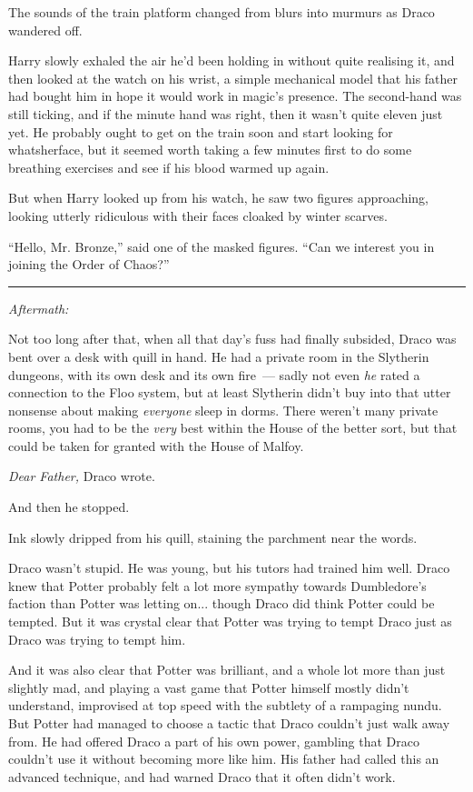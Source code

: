 The sounds of the train platform changed from blurs into murmurs as Draco wandered off.

Harry slowly exhaled the air he'd been holding in without quite realising it, and then looked at the watch on his wrist, a simple mechanical model that his father had bought him in hope it would work in magic's presence. The second-hand was still ticking, and if the minute hand was right, then it wasn't quite eleven just yet. He probably ought to get on the train soon and start looking for whatsherface, but it seemed worth taking a few minutes first to do some breathing exercises and see if his blood warmed up again.

But when Harry looked up from his watch, he saw two figures approaching, looking utterly ridiculous with their faces cloaked by winter scarves.

``Hello, Mr. Bronze,'' said one of the masked figures. ``Can we interest you in joining the Order of Chaos?''

\begin{center}\rule{3in}{0.4pt}\end{center}

\emph{Aftermath:}

Not too long after that, when all that day's fuss had finally subsided, Draco was bent over a desk with quill in hand. He had a private room in the Slytherin dungeons, with its own desk and its own fire~--- sadly not even \emph{he} rated a connection to the Floo system, but at least Slytherin didn't buy into that utter nonsense about making \emph{everyone} sleep in dorms. There weren't many private rooms, you had to be the \emph{very} best within the House of the better sort, but that could be taken for granted with the House of Malfoy.

\emph{Dear Father,} Draco wrote.

And then he stopped.

Ink slowly dripped from his quill, staining the parchment near the words.

Draco wasn't stupid. He was young, but his tutors had trained him well. Draco knew that Potter probably felt a lot more sympathy towards Dumbledore's faction than Potter was letting on... though Draco did think Potter could be tempted. But it was crystal clear that Potter was trying to tempt Draco just as Draco was trying to tempt him.

And it was also clear that Potter was brilliant, and a whole lot more than just slightly mad, and playing a vast game that Potter himself mostly didn't understand, improvised at top speed with the subtlety of a rampaging nundu. But Potter had managed to choose a tactic that Draco couldn't just walk away from. He had offered Draco a part of his own power, gambling that Draco couldn't use it without becoming more like him. His father had called this an advanced technique, and had warned Draco that it often didn't work.

